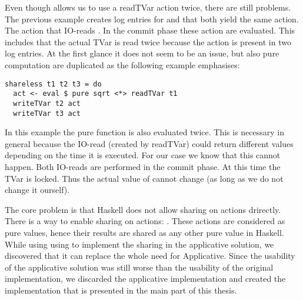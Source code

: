 Even though  allows us to use a readTVar action twice, there are still problems. The previous example
creates log entries for  and  that both yield the same  action. The  
action that IO-reads . In the commit phase these action are evaluated. This includes that the actual 
TVar is read twice because the action is present in two log entries. At the first glance it does not seem to
be an issue, but also pure computation are duplicated as the following example emphasises:
\begin{lstlisting}
shareless t1 t2 t3 = do 
  act <- eval $ pure sqrt <*> readTVar t1
  writeTVar t2 act
  writeTVar t3 act
\end{lstlisting}
In this example the pure function  is also evaluated twice. This is necessary in general because the 
IO-read (created by readTVar) could return different values depending on the time it is executed. For our case
we know that this cannot happen. Both IO-reads are performed in the commit phase. At this time the TVar  is 
locked. Thus the actual value of  cannot change (as long as we do not change it ourself). 

The core problem is that Haskell does not allow sharing on  actions drirectly. There is a way to enable 
sharing on  actions: . These actions are considered as pure values, 
hence their results are shared as any other pure value in Haskell. While using using 
to implement the sharing in the applicative solution, we discovered that it can replace the whole need for 
Applicative. Since the usability of the applicative solution was still worse than the usability of the 
original implementation, we discarded the applicative implementation and created the implementation that
is presented in the main part of this thesis.


